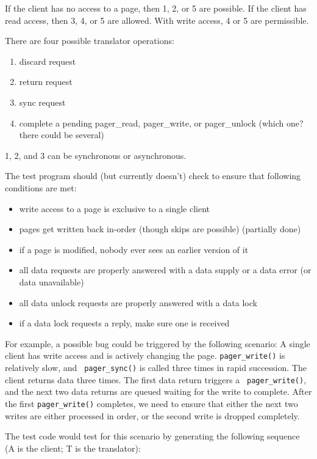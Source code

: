 \documentclass{article}
\begin{document}
If the client has no access to a page, then 1, 2, or 5 are possible.
If the client has read access, then 3, 4, or 5 are allowed.  With
write access, 4 or 5 are permissible.

There are four possible translator operations:

\begin{enumerate}
\item discard request
\item return request
\item sync request
\item complete a pending pager_read, pager_write, or pager_unlock (which one? there could be several)
\end{enumerate}

1, 2, and 3 can be synchronous or asynchronous.

The test program should (but currently doesn't) check to ensure that
following conditions are met:

\begin{itemize}
\item write access to a page is exclusive to a single client
\item pages get written back in-order (though skips are possible) (partially done)
\item if a page is modified, nobody ever sees an earlier version of it
\item all data requests are properly answered with a data supply or a data error (or data unavailable)
\item all data unlock requests are properly answered with a data lock
\item if a data lock requests a reply, make sure one is received
\end{itemize}

For example, a possible bug could be triggered by the following
scenario: A single client has write access and is actively changing
the page.  {\tt pager_write()} is relatively slow, and {\tt
  pager_sync()} is called three times in rapid succession.  The client
returns data three times.  The first data return triggers a {\tt
  pager_write()}, and the next two data returns are queued waiting for
the write to complete.  After the first {\tt pager_write()} completes,
we need to ensure that either the next two writes are either processed
in order, or the second write is dropped completely.

The test code would test for this scenario by generating the following
sequence (A is the client; T is the translator):
\end{document}
